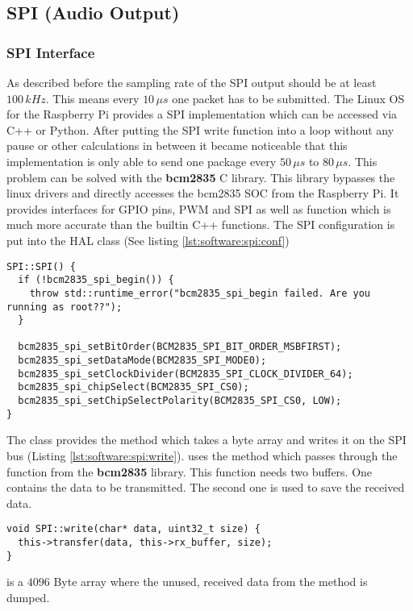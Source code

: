 \subsection{SPI (Audio Output)}

\subsubsection*{SPI Interface}

As described before the sampling rate of the SPI output should be at least $100\,kHz$. This means every $10\,\mu s$ one packet has to be submitted. The Linux OS for the Raspberry Pi provides a SPI implementation which can be accessed via C++ or Python. After putting the SPI write function into a loop without any pause or other calculations in between it became noticeable that this implementation is only able to send one package every $50\,\mu s$ to $80\,\mu s$. This problem can be solved with the \textbf{bcm2835} C library.\cite{mccauley_bcm2835_nodate} This library bypasses the linux drivers and directly accesses the bcm2835 SOC from the Raspberry Pi. It provides interfaces for GPIO pins, PWM and SPI as well as  function which is much more accurate than the builtin C++ functions.\p
%
The SPI configuration is put into the HAL class  (See listing \ref{lst:software:spi:conf})
%
\begin{mdframed}
\begin{lstlisting}[caption=SPI configuration, label=lst:software:spi:conf]
SPI::SPI() {
  if (!bcm2835_spi_begin()) {
    throw std::runtime_error("bcm2835_spi_begin failed. Are you running as root??");
  }

  bcm2835_spi_setBitOrder(BCM2835_SPI_BIT_ORDER_MSBFIRST);
  bcm2835_spi_setDataMode(BCM2835_SPI_MODE0);
  bcm2835_spi_setClockDivider(BCM2835_SPI_CLOCK_DIVIDER_64);
  bcm2835_spi_chipSelect(BCM2835_SPI_CS0);
  bcm2835_spi_setChipSelectPolarity(BCM2835_SPI_CS0, LOW);
}
\end{lstlisting}
\end{mdframed}
%
The  class provides the method  which takes a byte array and writes it on the SPI bus (Listing \ref{lst:software:spi:write}).  uses the method  which passes through the function  from the \textbf{bcm2835} library. This function needs two buffers. One contains the data to be transmitted. The second one is used to save the received data.
%
\begin{mdframed}
\begin{lstlisting}[caption=Method for writing data onto the SPI bus, label=lst:software:spi:write]
void SPI::write(char* data, uint32_t size) {
  this->transfer(data, this->rx_buffer, size);
}
\end{lstlisting}
\end{mdframed}
%
 is a $4096$ Byte array where the unused, received data from the  method is dumped.
%
